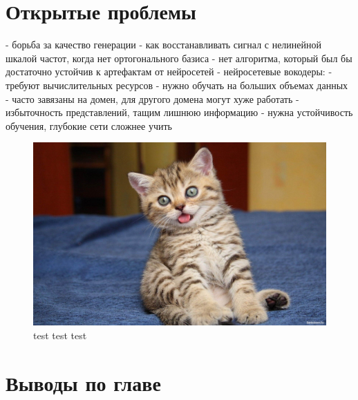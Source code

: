 \section{Открытые проблемы}
 - борьба за качество генерации
 - как восстанавливать сигнал с нелинейной шкалой частот, когда нет ортогонального базиса
 - нет алгоритма, который был бы достаточно устойчив к артефактам от нейросетей
 - нейросетевые вокодеры:
   - требуют вычислительных ресурсов
   - нужно обучать на больших объемах данных
   - часто завязаны на домен, для другого домена могут хуже работать
 - избыточность представлений, тащим лишнюю информацию
 - нужна устойчивость обучения, глубокие сети сложнее учить

\begin{figure}[t]
  \centering
  \includegraphics[width=16cm]{figures/cat}
  \caption{test test test}
  \label{fig:test}
\end{figure}


\section{Выводы по главе}

